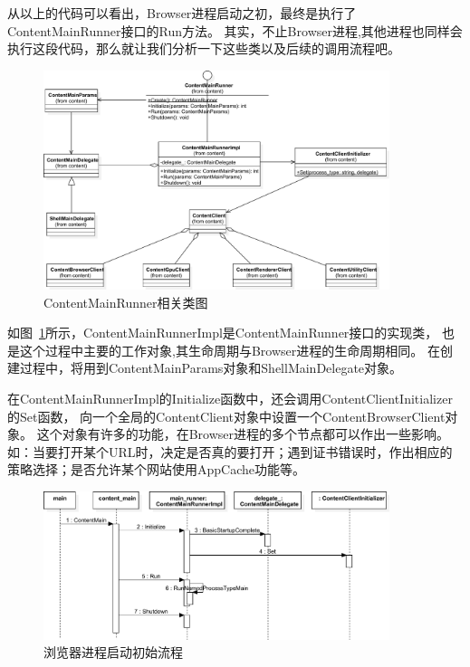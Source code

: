 从以上的代码可以看出，Browser进程启动之初，最终是执行了ContentMainRunner接口的Run方法。
其实，不止Browser进程,其他进程也同样会执行这段代码，那么就让我们分析一下这些类以及后续的调用流程吧。

\begin{figure}[H] 
  \centering 
  \includegraphics[width=0.90\textwidth]{image/process_study/ContentMainRunner.pdf} 
  \caption{ContentMainRunner相关类图} \label{fig:ContentMainRunnerClass} 
\end{figure}

如图~\ref{fig:ContentMainRunnerClass}所示，ContentMainRunnerImpl是ContentMainRunner接口的实现类，
也是这个过程中主要的工作对象,其生命周期与Browser进程的生命周期相同。
在创建过程中，将用到ContentMainParams对象和ShellMainDelegate对象。

在ContentMainRunnerImpl的Initialize函数中，还会调用ContentClientInitializer的Set函数，
向一个全局的ContentClient对象中设置一个ContentBrowserClient对象。
这个对象有许多的功能，在Browser进程的多个节点都可以作出一些影响。
如：当要打开某个URL时，决定是否真的要打开；遇到证书错误时，作出相应的策略选择；是否允许某个网站使用AppCache功能等。

\begin{figure}[H] 
  \centering 
  \includegraphics[width=0.90\textwidth]{image/process_study/ContentMainRunnerSequence.pdf} 
  \caption{浏览器进程启动初始流程} \label{fig:ContentMainRunnerSequence} 
\end{figure}

